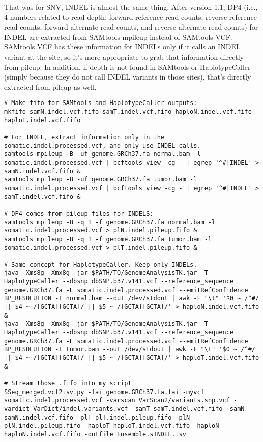 \documentclass[10pt,letterpaper]{article}
\begin{document}
\begin{sloppypar}
That was for SNV, INDEL is almost the same thing. After version 1.1, DP4 (i.e., 4 numbers related to read depth: forward reference read counts, reverse reference read counts, forward alternate read counts, and reverse alternate read counts) for INDEL are extracted from SAMtools mpileup instead of SAMtools VCF. SAMtools VCF has these information for INDELs only if it calls an INDEL variant at the site, so it's more appropriate to grab that information directly from pileup. In addition, if depth is not found in SAMtools or HaplotypeCaller (simply because they do not call INDEL variants in those sites), that's directly extracted from pileup as well. 

\begin{lstlisting}
# Make fifo for SAMtools and HaplotypeCaller outputs:
mkfifo samN.indel.vcf.fifo samT.indel.vcf.fifo haploN.indel.vcf.fifo haploT.indel.vcf.fifo

# For INDEL, extract information only in the somatic.indel.processed.vcf, and only use INDEL calls.
samtools mpileup -B -uf genome.GRCh37.fa normal.bam -l somatic.indel.processed.vcf | bcftools view -cg - | egrep '^#|INDEL' > samN.indel.vcf.fifo &
samtools mpileup -B -uf genome.GRCh37.fa tumor.bam -l somatic.indel.processed.vcf | bcftools view -cg - | egrep '^#|INDEL' > samT.indel.vcf.fifo &

# DP4 comes from pileup files for INDELS:
samtools mpileup -B -q 1 -f genome.GRCh37.fa normal.bam -l somatic.indel.processed.vcf > plN.indel.pileup.fifo &
samtools mpileup -B -q 1 -f genome.GRCh37.fa tumor.bam -l somatic.indel.processed.vcf > plT.indel.pileup.fifo &

# Same concept for HaplotypeCaller. Keep only INDELs.
java -Xms8g -Xmx8g -jar $PATH/TO/GenomeAnalysisTK.jar -T HaplotypeCaller --dbsnp dbSNP.b37.v141.vcf --reference_sequence genome.GRCh37.fa -L somatic.indel.processed.vcf --emitRefConfidence BP_RESOLUTION -I normal.bam --out /dev/stdout | awk -F "\t" '$0 ~ /^#/ || $4 ~ /[GCTA][GCTA]/ || $5 ~ /[GCTA][GCTA]/' > haploN.indel.vcf.fifo &
java -Xms8g -Xmx8g -jar $PATH/TO/GenomeAnalysisTK.jar -T HaplotypeCaller --dbsnp dbSNP.b37.v141.vcf --reference_sequence genome.GRCh37.fa -L somatic.indel.processed.vcf --emitRefConfidence BP_RESOLUTION -I tumor.bam --out /dev/stdout | awk -F "\t" '$0 ~ /^#/ || $4 ~ /[GCTA][GCTA]/ || $5 ~ /[GCTA][GCTA]/' > haploT.indel.vcf.fifo &

# Stream those .fifo into my script		
SSeq_merged.vcf2tsv.py -fai genome.GRCh37.fa.fai -myvcf somatic.indel.processed.vcf -varscan VarScan2/variants.snp.vcf -vardict VarDict/indel.variants.vcf -samT samT.indel.vcf.fifo -samN samN.indel.vcf.fifo -plT plT.indel.pileup.fifo -plN plN.indel.pileup.fifo -haploT haploT.indel.vcf.fifo -haploN haploN.indel.vcf.fifo -outfile Ensemble.sINDEL.tsv
\end{lstlisting}



\end{sloppypar}
\end{document}
